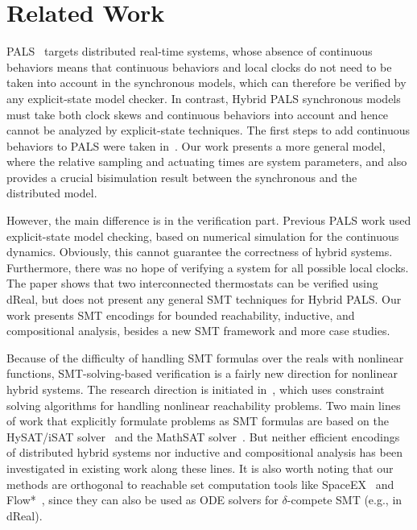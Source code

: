 

\section{Related Work}
\label{sec:related-work}

PALS~\cite{pals-rtss09,mr-pals-journal,pals-tcs,al2012pattern} targets
distributed real-time systems, whose absence of continuous behaviors
means that continuous behaviors and local clocks do not need to be
taken into account in the synchronous models, which can therefore be
verified by any explicit-state model checker. In contrast, Hybrid PALS
synchronous models must take both clock skews and continuous behaviors
into account and hence cannot be analyzed by explicit-state
techniques. The first steps to add continuous behaviors to PALS were
taken in~\cite{hybrid-pals}. Our work presents a more general
model, where the relative sampling and actuating times are system
parameters,  and also provides a crucial bisimulation result between
the 
synchronous and the distributed model. 

However,  the main difference is in the verification part. 
Previous PALS work \cite{ftscs-journal} used explicit-state model checking, 
based on numerical simulation for the continuous dynamics.
Obviously, this cannot guarantee the correctness of hybrid systems.
Furthermore,
there was no hope of verifying a system for  all possible local clocks.
The paper \cite{hybrid-pals} shows that two interconnected thermostats
can be verified using \textsf{dReal}, but does not present any general SMT techniques for 
Hybrid PALS.
Our work presents SMT encodings for bounded reachability, inductive, and
compositional analysis, %
besides a new SMT framework and more case studies.

Because of the difficulty of handling SMT
formulas over the reals with nonlinear functions, 
SMT-solving-based verification is a fairly new direction for nonlinear hybrid
systems. The research
direction is initiated in~\cite{ratschan2007safety}, which uses constraint
solving algorithms for handling nonlinear reachability problems. Two
main lines of work that explicitly formulate problems as SMT formulas
are based on the HySAT/iSAT
solver~\cite{DBLP:journals/fmsd/FranzleH07,eggers2008sat}
and the MathSAT
solver~\cite{DBLP:conf/aaai/CimattiMT12,DBLP:conf/fmcad/CimattiMT12}.
But neither efficient encodings of distributed hybrid systems nor 
inductive and compositional analysis has  been
investigated in existing work along these lines. 
%
It is also worth noting that 
our methods are orthogonal to reachable set computation tools like SpaceEX~\cite{DBLP:conf/cav/FrehseGDCRLRGDM11}
and Flow*~\cite{DBLP:conf/cav/ChenAS13},
since they can also be used as ODE solvers for $\delta$-compete SMT (e.g., in \textsf{dReal}).

